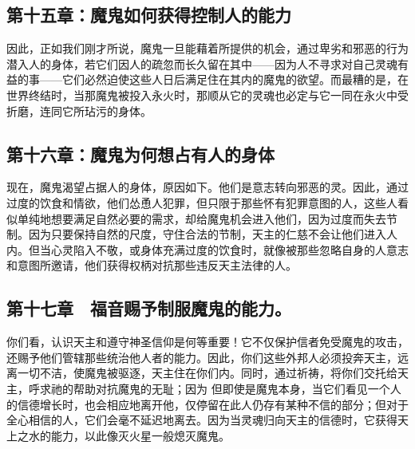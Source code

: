 \subsection{第十五章：魔鬼如何获得控制人的能力}

因此，正如我们刚才所说，魔鬼一旦能藉着所提供的机会，通过卑劣和邪恶的行为潜入人的身体，若它们因人的疏忽而长久留在其中——因为人不寻求对自己灵魂有益的事——它们必然迫使这些人日后满足住在其内的魔鬼的欲望。而最糟的是，在世界终结时，当那魔鬼被投入永火时，那顺从它的灵魂也必定与它一同在永火中受折磨，连同它所玷污的身体。\par


\subsection{第十六章：魔鬼为何想占有人的身体}

现在，魔鬼渴望占据人的身体，原因如下。他们是意志转向邪恶的灵。因此，通过过度的饮食和情欲，他们怂恿人犯罪，但只限于那些怀有犯罪意图的人，这些人看似单纯地想要满足自然必要的需求，却给魔鬼机会进入他们，因为过度而失去节制。因为只要保持自然的尺度，守住合法的节制，天主的仁慈不会让他们进入人内。但当心灵陷入不敬，或身体充满过度的饮食时，就像被那些忽略自身的人意志和意图所邀请，他们获得权柄对抗那些违反天主法律的人。\par


\subsection{第十七章　福音赐予制服魔鬼的能力。}

你们看，认识天主和遵守神圣信仰是何等重要！它不仅保护信者免受魔鬼的攻击，还赐予他们管辖那些统治他人者的能力。因此，你们这些外邦人必须投奔天主，远离一切不洁，使魔鬼被驱逐，天主住在你们内。同时，通过祈祷，将你们交托给天主，呼求祂的帮助对抗魔鬼的无耻；因为 但即使是魔鬼本身，当它们看见一个人的信德增长时，也会相应地离开他，仅停留在此人仍存有某种不信的部分；但对于全心相信的人，它们会毫不延迟地离去。因为当灵魂归向天主的信德时，它获得天上之水的能力，以此像灭火星一般熄灭魔鬼。\par


